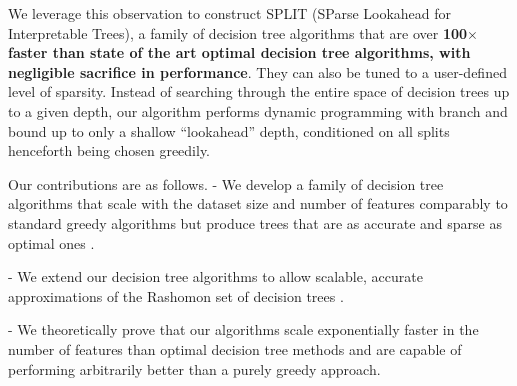 We leverage this observation to construct SPLIT (SParse Lookahead for Interpretable Trees), a family of decision tree algorithms that are over \textbf{100$\times$ faster than state of the art optimal decision tree algorithms, with negligible sacrifice in performance}. They can also be tuned to a user-defined level of sparsity. Instead of searching through the entire space of decision trees up to a given depth, our algorithm performs dynamic programming with branch and bound up to only 
a shallow ``lookahead'' depth, conditioned on all splits henceforth being chosen greedily.


Our contributions are as follows.
- We develop a family of decision tree algorithms that scale with the dataset size and number of features comparably to standard greedy algorithms but produce trees that are as accurate and sparse as optimal ones \citep[e.g.,][]{gosdt}.

- We extend our decision tree algorithms to allow scalable, accurate approximations of the Rashomon set of decision trees \citep{breiman2001statistical, xin2022treefarms}.

- We theoretically prove that our algorithms scale exponentially faster in the number of features than optimal decision tree methods and are capable of performing arbitrarily better than a purely greedy approach.
